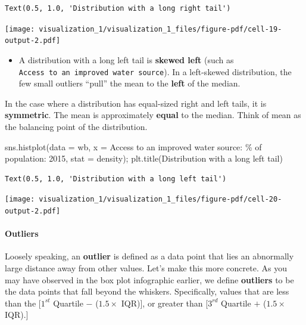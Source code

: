 \documentclass[
  letterpaper,
  DIV=11,
  numbers=noendperiod]{scrreprt}
\let\oldparagraph\paragraph
\renewcommand{\paragraph}[1]{\oldparagraph{#1}\mbox{}}
\newenvironment{Shaded}{\begin{snugshade}}{\end{snugshade}}
\newcommand{\NormalTok}[1]{\textcolor[rgb]{0.00,0.23,0.31}{#1}}
\newcommand{\OperatorTok}[1]{\textcolor[rgb]{0.37,0.37,0.37}{#1}}
\newcommand{\SpecialCharTok}[1]{\textcolor[rgb]{0.37,0.37,0.37}{#1}}
\newcommand{\StringTok}[1]{\textcolor[rgb]{0.13,0.47,0.30}{#1}}
\providecommand{\tightlist}{%
  \setlength{\itemsep}{0pt}\setlength{\parskip}{0pt}}\usepackage{longtable,booktabs,array}
\begin{document}
\begin{verbatim}
Text(0.5, 1.0, 'Distribution with a long right tail')
\end{verbatim}

\texttt{[image: visualization\_1/visualization\_1\_files/figure-pdf/cell-19-output-2.pdf]}

\begin{itemize}
\tightlist
\item
  A distribution with a long left tail is \textbf{skewed left} (such as
  \texttt{Access\ to\ an\ improved\ water\ source}). In a left-skewed
  distribution, the few small outliers ``pull'' the mean to the
  \textbf{left} of the median.
\end{itemize}

In the case where a distribution has equal-sized right and left tails,
it is \textbf{symmetric}. The mean is approximately \textbf{equal} to
the median. Think of mean as the balancing point of the distribution.

\begin{Shaded}
\begin{Highlighting}[]
\NormalTok{sns.histplot(data }\OperatorTok{=}\NormalTok{ wb, x }\OperatorTok{=} \StringTok{\textquotesingle{}Access to an improved water source: }\SpecialCharTok{\% o}\StringTok{f population: 2015\textquotesingle{}}\NormalTok{, stat }\OperatorTok{=} \StringTok{\textquotesingle{}density\textquotesingle{}}\NormalTok{)}\OperatorTok{;}
\NormalTok{plt.title(}\StringTok{\textquotesingle{}Distribution with a long left tail\textquotesingle{}}\NormalTok{)}
\end{Highlighting}
\end{Shaded}

\begin{verbatim}
Text(0.5, 1.0, 'Distribution with a long left tail')
\end{verbatim}

\texttt{[image: visualization\_1/visualization\_1\_files/figure-pdf/cell-20-output-2.pdf]}

\paragraph{Outliers}\label{outliers}

Loosely speaking, an \textbf{outlier} is defined as a data point that
lies an abnormally large distance away from other values. Let's make
this more concrete. As you may have observed in the box plot infographic
earlier, we define \textbf{outliers} to be the data points that fall
beyond the whiskers. Specifically, values that are less than the
{[}\(1^{st}\) Quartile \(-\) (\(1.5\times\) IQR){]}, or greater than
{[}\(3^{rd}\) Quartile \(+\) (\(1.5\times\) IQR).{]}
\end{document}
